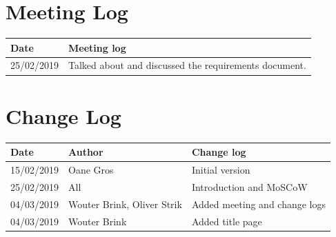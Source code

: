 \documentclass{article}
\begin{document}
\section{Meeting Log}
\begin{center}
 \begin{tabular}{ | l | l | }
  \hline
  \bf{Date} & \bf{Meeting log} \\
  \hline
  25/02/2019 & Talked about and discussed the requirements document. \\
  \hline
 \end{tabular}
\end{center}

\section{Change Log}
\begin{center}
 \begin{tabular}{ | l | l | l | }
  \hline
  \bf{Date} & \bf{Author} & \bf{Change log} \\
  \hline
  15/02/2019 & Oane Gros & Initial version \\
  \hline
  25/02/2019 & All & Introduction and MoSCoW \\
  \hline
  04/03/2019 & Wouter Brink, Oliver Strik & Added meeting and change logs\\
  \hline
  04/03/2019 & Wouter Brink & Added title page \\
  \hline
 \end{tabular}
\end{center}
\end{document}
